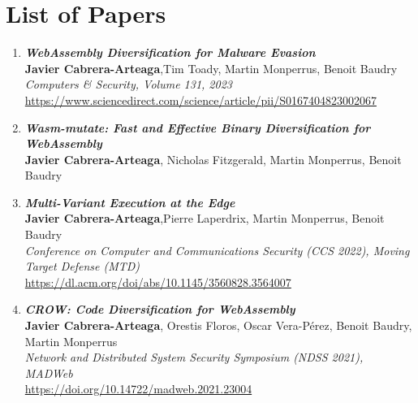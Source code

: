 
\chapter{List of Papers}

\begin{enumerate}[I]
    \item \textbf{\textit{WebAssembly Diversification for Malware Evasion}} \\
        \textbf{Javier Cabrera-Arteaga},Tim Toady, Martin Monperrus, Benoit Baudry\\
        \textit{Computers \& Security, Volume 131, 2023} \\
        \url{https://www.sciencedirect.com/science/article/pii/S0167404823002067}
    \item \textbf{\textit{Wasm-mutate: Fast and Effective Binary Diversification for
    WebAssembly}} \\
        \textbf{Javier Cabrera-Arteaga}, Nicholas Fitzgerald, Martin Monperrus, Benoit Baudry\\
    \item \textbf{\textit{Multi-Variant Execution at the Edge}} \\
    \textbf{Javier Cabrera-Arteaga},Pierre Laperdrix, Martin Monperrus, Benoit Baudry\\
    \textit{Conference on Computer and Communications Security (CCS 2022), Moving Target Defense (MTD)} \\
    \url{https://dl.acm.org/doi/abs/10.1145/3560828.3564007}

    \item \textbf{\textit{CROW: Code Diversification for WebAssembly}} \\
        \textbf{Javier Cabrera-Arteaga}, Orestis Floros, Oscar Vera-Pérez, Benoit Baudry, Martin Monperrus\\
        \textit{Network and Distributed System Security Symposium (NDSS 2021), MADWeb} \\
        \url{https://doi.org/10.14722/madweb.2021.23004}
    

\end{enumerate}

